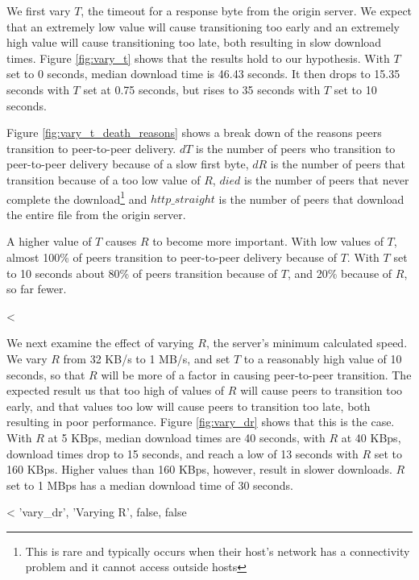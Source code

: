 We first vary $T$, the timeout for a response byte from the origin server. We expect that an extremely low value 
will cause transitioning too early and an extremely high value 
will cause transitioning too late, both resulting in slow download times. Figure \ref{fig:vary_t} shows that 
the results hold to our hypothesis. With $T$ set to 0 seconds, median download time is 46.43 seconds. It then drops to 15.35 seconds with $T$ set at 0.75 seconds, 
but rises to 35 seconds with $T$ set to 10 seconds.

Figure \ref{fig:vary_t_death_reasons} shows a break down of the reasons peers transition to peer-to-peer delivery.  $dT$ is the number
of peers who transition to peer-to-peer delivery because of a slow first byte, $dR$ is the number of
peers that transition because of a too low value of $R$, $died$ is the number of peers that never complete the download\footnote{This is 
rare and typically occurs when their host's network has a connectivity problem and it cannot access outside hosts} and $http\_straight$ is the number of peers
that download the entire file from the origin server.

A higher value of $T$ causes $R$ to become more important.  With low values of $T$, almost 100\% of peers transition to peer-to-peer delivery because of $T$. 
With $T$ set to 10 seconds about 80\% of peers transition because of $T$, and 20\% because of $R$, so far fewer.

<%

We next examine the effect of varying $R$, the server's minimum calculated speed.  We vary $R$ from 32 KB/s to 1 MB/s, and set $T$ to a 
reasonably high value of 10 seconds, so that $R$ will be more of a factor in causing peer-to-peer transition. 
The expected result us that too high of values of $R$ will cause peers to transition 
too early, and that values too low will cause peers to transition too late, both resulting in poor performance. Figure \ref{fig:vary_dr} shows that this is the case.
With $R$ at 5 KBps, median download times are 40 seconds, with $R$ at 40 KBps, download times drop to 15 seconds, and reach
a low of 13 seconds with $R$ set to 160 KBps. Higher values than 160 KBps, however, result in slower downloads.  $R$ set to 1 MBps has a median download time of 30 seconds. 

<%
  'vary_dr', 'Varying R', false, false %

